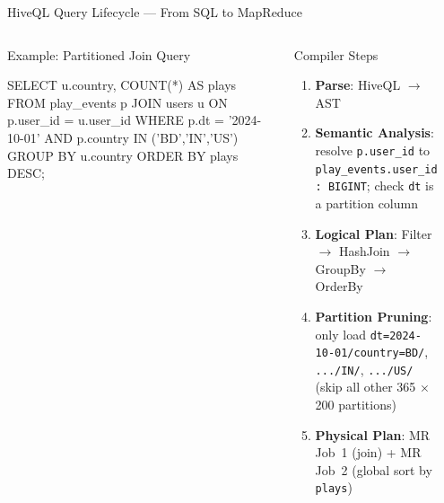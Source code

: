 \documentclass[aspectratio=169,10pt]{beamer}
\begin{document}
\begin{frame}{HiveQL Query Lifecycle — From SQL to MapReduce}
  \begin{columns}[T]
      \begin{block}{Example: Partitioned Join Query}
        \begin{semiverbatim}
\scriptsize
SELECT u.country, COUNT(*) AS plays
FROM   play\_events p
JOIN   users u ON p.user\_id = u.user\_id
WHERE  p.dt = '2024-10-01'
  AND  p.country IN ('BD','IN','US')
GROUP BY u.country
ORDER BY plays DESC;
        \end{semiverbatim}
      \end{block}
      \vspace{5pt}
      \begin{block}{Compiler Steps}
        \begin{enumerate}
          \item \textbf{Parse}: HiveQL $\to$ AST
          \item \textbf{Semantic Analysis}: resolve \texttt{p.user\_id}
                to \texttt{play\_events.user\_id : BIGINT};
                check \texttt{dt} is a partition column
          \item \textbf{Logical Plan}: Filter $\to$ HashJoin $\to$
                GroupBy $\to$ OrderBy
          \item \textbf{Partition Pruning}: only load
                \texttt{dt=2024-10-01/country=BD/},
                \texttt{.../IN/}, \texttt{.../US/}
                (skip all other 365 $\times$ 200 partitions)
          \item \textbf{Physical Plan}: MR Job~1 (join) + MR Job~2
                (global sort by \texttt{plays})
        \end{enumerate}
      \end{block}

      \begin{center}
\end{center}
\end{columns}
\end{frame}
\end{document}
